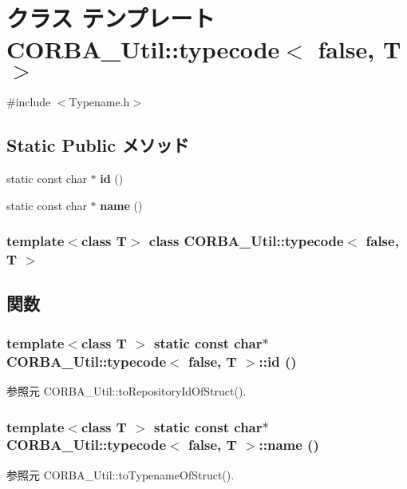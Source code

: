 \section{クラス テンプレート CORBA\_\-Util::typecode$<$ false, T $>$}
\label{classCORBA__Util_1_1typecode_3_01false_00_01T_01_4}


{\ttfamily \#include $<$Typename.h$>$}

\subsection*{Static Public メソッド}
\begin{DoxyCompactItemize}
\item 
static const char $\ast$ {\bf id} ()
\item 
static const char $\ast$ {\bf name} ()
\end{DoxyCompactItemize}
\subsubsection*{template$<$class T$>$ class CORBA\_\-Util::typecode$<$ false, T $>$}



\subsection{関数}
\subsubsection[{id}]{\setlength{\rightskip}{0pt plus 5cm}template$<$class T $>$ static const char$\ast$ CORBA\_\-Util::typecode$<$ false, T $>$::id ()\hspace{0.3cm}{\ttfamily  [inline, static]}}\label{classCORBA__Util_1_1typecode_3_01false_00_01T_01_4_a48449b3825b809de7434edd450e69878}


参照元 CORBA\_\-Util::toRepositoryIdOfStruct().

\subsubsection[{name}]{\setlength{\rightskip}{0pt plus 5cm}template$<$class T $>$ static const char$\ast$ CORBA\_\-Util::typecode$<$ false, T $>$::name ()\hspace{0.3cm}{\ttfamily  [inline, static]}}\label{classCORBA__Util_1_1typecode_3_01false_00_01T_01_4_a07d95d95e8e2acf0364ddb0e83865403}


参照元 CORBA\_\-Util::toTypenameOfStruct().

